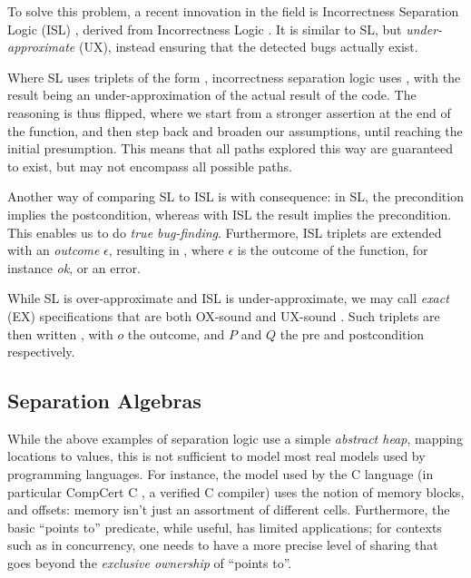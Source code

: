 To solve this problem, a recent innovation in the field is Incorrectness Separation Logic (ISL) \cite{isl}, derived from Incorrectness Logic \cite{incorrectnesslogic}. It is similar to SL, but \emph{under-approximate} (UX), instead ensuring that the detected bugs actually exist.

Where SL uses triplets of the form , incorrectness separation logic uses , with the result being an under-approximation of the actual result of the code. The reasoning is thus flipped, where we start from a stronger assertion at the end of the function, and then step back and broaden our assumptions, until reaching the initial presumption. This means that all paths explored this way are guaranteed to exist, but may not encompass all possible paths.

Another way of comparing SL to ISL is with consequence: in SL, the precondition implies the postcondition, whereas with ISL the result implies the precondition. This enables us to do \emph{true bug-finding}. Furthermore, ISL triplets are extended with an \emph{outcome} $\epsilon$, resulting in , where $\epsilon$ is the outcome of the function, for instance \textit{ok}, or an error.

While SL is over-approximate and ISL is under-approximate, we may call \emph{exact} (EX) specifications that are both OX-sound and UX-sound \cite{exactsl}. Such triplets are then written , with $o$ the outcome, and $P$ and $Q$ the pre and postcondition respectively.

\subsection{Separation Algebras}

While the above examples of separation logic use a simple \emph{abstract heap}, mapping locations to values, this is not sufficient to model most real models used by programming languages. For instance, the model used by the C language (in particular CompCert C \cite{compcert}, a verified C compiler) uses the notion of memory blocks, and offsets: memory isn't just an assortment of different cells. Furthermore, the basic ``points to'' predicate, while useful, has limited applications; for contexts such as in concurrency, one needs to have a more precise level of sharing that goes beyond the \emph{exclusive ownership} of ``points to''.

